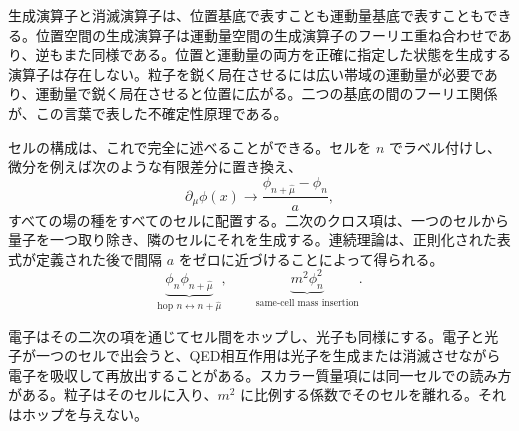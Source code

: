 生成演算子と消滅演算子は、位置基底で表すことも運動量基底で表すこともできる。位置空間の生成演算子は運動量空間の生成演算子のフーリエ重ね合わせであり、逆もまた同様である。位置と運動量の両方を正確に指定した状態を生成する演算子は存在しない。粒子を鋭く局在させるには広い帯域の運動量が必要であり、運動量で鋭く局在させると位置に広がる。二つの基底の間のフーリエ関係が、この言葉で表した不確定性原理である。

\begin{classroomqa}
\end{classroomqa}

セルの構成は、これで完全に述べることができる。セルを \(n\) でラベル付けし、微分を例えば次のような有限差分に置き換え、
\begin{equation}
\partial_\mu\phi(x)
\longrightarrow
\frac{\phi_{n+\hat\mu}-\phi_n}{a},
\end{equation}
すべての場の種をすべてのセルに配置する。二次のクロス項は、一つのセルから量子を一つ取り除き、隣のセルにそれを生成する。連続理論は、正則化された表式が定義された後で間隔 \(a\) をゼロに近づけることによって得られる。
\begin{equation}
\underbrace{\phi_n\phi_{n+\hat\mu}}_{\text{hop }n\leftrightarrow n+\hat\mu},
\qquad
\underbrace{m^2\phi_n^2}_{\text{same-cell mass insertion}}.
\end{equation}

\begin{classroomqa}
\end{classroomqa}

電子はその二次の項を通じてセル間をホップし、光子も同様にする。電子と光子が一つのセルで出会うと、QED相互作用は光子を生成または消滅させながら電子を吸収して再放出することがある。スカラー質量項には同一セルでの読み方がある。粒子はそのセルに入り、\(m^2\) に比例する係数でそのセルを離れる。それはホップを与えない。

\begin{classroomqa}
\end{classroomqa}

